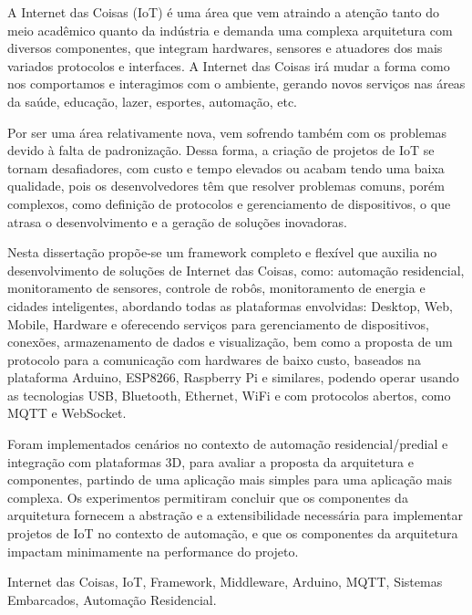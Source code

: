 A Internet das Coisas (IoT) é uma área que vem atraindo a atenção
tanto do meio acadêmico quanto da indústria e demanda uma complexa
arquitetura com diversos componentes, que integram hardwares, sensores
e atuadores dos mais variados protocolos e interfaces. A Internet
das Coisas irá mudar a forma como nos comportamos e interagimos com
o ambiente, gerando novos serviços nas áreas da saúde, educação, lazer,
esportes, automação, etc. 

Por ser uma área relativamente nova, vem sofrendo também com os problemas
devido à falta de padronização. Dessa forma, a criação de projetos
de IoT se tornam desafiadores, com custo e tempo elevados ou acabam
tendo uma baixa qualidade, pois os desenvolvedores têm que resolver
problemas comuns, porém complexos, como definição de protocolos e
gerenciamento de dispositivos, o que atrasa o desenvolvimento e a
geração de soluções inovadoras.

Nesta dissertação propõe-se um framework completo e flexível que auxilia
no desenvolvimento de soluções de Internet das Coisas, como: automação
residencial, monitoramento de sensores, controle de robôs, monitoramento
de energia e cidades inteligentes, abordando todas as plataformas
envolvidas: Desktop, Web, Mobile, Hardware e oferecendo serviços para
gerenciamento de dispositivos, conexões, armazenamento de dados e
visualização, bem como a proposta de um protocolo para a comunicação
com hardwares de baixo custo, baseados na plataforma Arduino, ESP8266,
Raspberry Pi e similares, podendo operar usando as tecnologias USB,
Bluetooth, Ethernet, WiFi e com protocolos abertos, como MQTT e WebSocket.

Foram implementados cenários no contexto de automação residencial/predial
e integração com plataformas 3D, para avaliar a proposta da arquitetura
e componentes, partindo de uma aplicação mais simples para uma aplicação
mais complexa. Os experimentos permitiram concluir que os componentes
da arquitetura fornecem a abstração e a extensibilidade necessária
para implementar projetos de IoT no contexto de automação, e que os
componentes da arquitetura impactam minimamente na performance do
projeto.

\begin{keywords}
Internet das Coisas, IoT, Framework, Middleware, Arduino, MQTT, Sistemas Embarcados, Automação Residencial.
\end{keywords}
